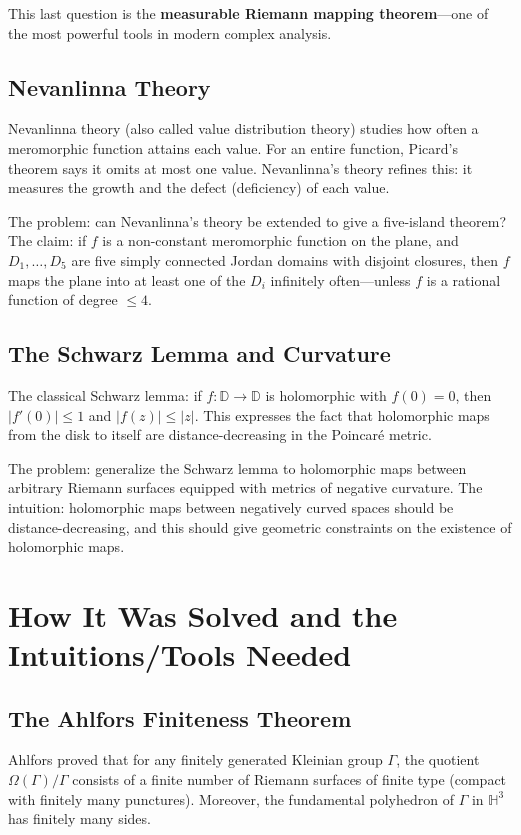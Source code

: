 This last question is the \textbf{measurable Riemann mapping theorem}---one of the most powerful tools in modern complex analysis.

\subsection{Nevanlinna Theory}

Nevanlinna theory (also called value distribution theory) studies how often a meromorphic function attains each value. For an entire function, Picard's theorem says it omits at most one value. Nevanlinna's theory refines this: it measures the growth and the defect (deficiency) of each value.

The problem: can Nevanlinna's theory be extended to give a five-island theorem? The claim: if $f$ is a non-constant meromorphic function on the plane, and $D_1,\dots,D_5$ are five simply connected Jordan domains with disjoint closures, then $f$ maps the plane into at least one of the $D_i$ infinitely often---unless $f$ is a rational function of degree $\leq 4$.

\subsection{The Schwarz Lemma and Curvature}

The classical Schwarz lemma: if $f: \mathbb{D} \to \mathbb{D}$ is holomorphic with $f(0)=0$, then $|f'(0)| \leq 1$ and $|f(z)| \leq |z|$. This expresses the fact that holomorphic maps from the disk to itself are distance-decreasing in the Poincar{\'e} metric.

The problem: generalize the Schwarz lemma to holomorphic maps between arbitrary Riemann surfaces equipped with metrics of negative curvature. The intuition: holomorphic maps between negatively curved spaces should be distance-decreasing, and this should give geometric constraints on the existence of holomorphic maps.

\section{How It Was Solved and the Intuitions/Tools Needed}

\subsection{The Ahlfors Finiteness Theorem}

Ahlfors proved that for any finitely generated Kleinian group $\Gamma$, the quotient $\Omega(\Gamma)/\Gamma$ consists of a finite number of Riemann surfaces of finite type (compact with finitely many punctures). Moreover, the fundamental polyhedron of $\Gamma$ in $\mathbb{H}^3$ has finitely many sides.

